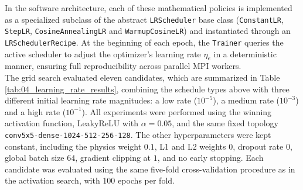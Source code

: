 In the software architecture, each of these mathematical policies is implemented as a specialized subclass of the abstract \texttt{LRScheduler} base class (\texttt{ConstantLR}, \texttt{StepLR}, \texttt{CosineAnnealingLR} and \texttt{WarmupCosineLR}) and instantiated through an \texttt{LRSchedulerRecipe}. At the beginning of each epoch, the \texttt{Trainer} queries the active scheduler to adjust the optimizer's learning rate $\eta_e$ in a deterministic manner, ensuring full reproducibility across parallel MPI workers.\\

The grid search evaluated eleven candidates, which are summarized in Table \ref{tab:04_learning_rate_results}, combining the schedule types above with three different initial learning rate magnitudes: a low rate ($10^{-5}$), a medium rate ($10^{-3}$) and a high rate ($10^{-1}$). All experiments were performed using the winning activation function, LeakyReLU with $\alpha=0.05$, and the same fixed topology \texttt{conv5x5-dense-1024-512-256-128}. The other hyperparameters were kept constant, including the physics weight $0.1$, L1 and L2 weights $0$, dropout rate $0$, global batch size $64$, gradient clipping at $1$, and no early stopping. Each candidate was evaluated using the same five-fold cross-validation procedure as in the activation search, with 100 epochs per fold.

